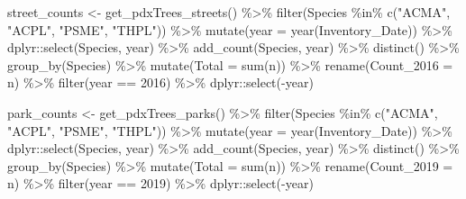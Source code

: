 \documentclass[12pt,twoside]{reedthesis}
\newenvironment{Shaded}{\begin{snugshade}}{\end{snugshade}}
\newcommand{\AttributeTok}[1]{\textcolor[rgb]{0.77,0.63,0.00}{#1}}
\newcommand{\DecValTok}[1]{\textcolor[rgb]{0.00,0.00,0.81}{#1}}
\newcommand{\FunctionTok}[1]{\textcolor[rgb]{0.00,0.00,0.00}{#1}}
\newcommand{\NormalTok}[1]{#1}
\newcommand{\OtherTok}[1]{\textcolor[rgb]{0.56,0.35,0.01}{#1}}
\newcommand{\SpecialCharTok}[1]{\textcolor[rgb]{0.00,0.00,0.00}{#1}}
\newcommand{\StringTok}[1]{\textcolor[rgb]{0.31,0.60,0.02}{#1}}
\begin{document}
\footnotesize
\begin{Shaded}
\begin{Highlighting}[]
\NormalTok{street\_counts }\OtherTok{\textless{}{-}} \FunctionTok{get\_pdxTrees\_streets}\NormalTok{() }\SpecialCharTok{\%\textgreater{}\%}
    \FunctionTok{filter}\NormalTok{(Species }\SpecialCharTok{\%in\%} \FunctionTok{c}\NormalTok{(}\StringTok{"ACMA"}\NormalTok{, }\StringTok{"ACPL"}\NormalTok{, }\StringTok{"PSME"}\NormalTok{, }\StringTok{"THPL"}\NormalTok{)) }\SpecialCharTok{\%\textgreater{}\%}
    \FunctionTok{mutate}\NormalTok{(}\AttributeTok{year =} \FunctionTok{year}\NormalTok{(Inventory\_Date)) }\SpecialCharTok{\%\textgreater{}\%}
\NormalTok{    dplyr}\SpecialCharTok{::}\FunctionTok{select}\NormalTok{(Species, year) }\SpecialCharTok{\%\textgreater{}\%}
    \FunctionTok{add\_count}\NormalTok{(Species, year) }\SpecialCharTok{\%\textgreater{}\%}
    \FunctionTok{distinct}\NormalTok{() }\SpecialCharTok{\%\textgreater{}\%}
    \FunctionTok{group\_by}\NormalTok{(Species) }\SpecialCharTok{\%\textgreater{}\%}
    \FunctionTok{mutate}\NormalTok{(}\AttributeTok{Total =} \FunctionTok{sum}\NormalTok{(n)) }\SpecialCharTok{\%\textgreater{}\%}
    \FunctionTok{rename}\NormalTok{(}\AttributeTok{Count\_2016 =}\NormalTok{ n) }\SpecialCharTok{\%\textgreater{}\%}
    \FunctionTok{filter}\NormalTok{(year }\SpecialCharTok{==} \DecValTok{2016}\NormalTok{) }\SpecialCharTok{\%\textgreater{}\%}
\NormalTok{    dplyr}\SpecialCharTok{::}\FunctionTok{select}\NormalTok{(}\SpecialCharTok{{-}}\NormalTok{year)}

\NormalTok{park\_counts }\OtherTok{\textless{}{-}} \FunctionTok{get\_pdxTrees\_parks}\NormalTok{() }\SpecialCharTok{\%\textgreater{}\%}
    \FunctionTok{filter}\NormalTok{(Species }\SpecialCharTok{\%in\%} \FunctionTok{c}\NormalTok{(}\StringTok{"ACMA"}\NormalTok{, }\StringTok{"ACPL"}\NormalTok{, }\StringTok{"PSME"}\NormalTok{, }\StringTok{"THPL"}\NormalTok{)) }\SpecialCharTok{\%\textgreater{}\%}
    \FunctionTok{mutate}\NormalTok{(}\AttributeTok{year =} \FunctionTok{year}\NormalTok{(Inventory\_Date)) }\SpecialCharTok{\%\textgreater{}\%}
\NormalTok{    dplyr}\SpecialCharTok{::}\FunctionTok{select}\NormalTok{(Species, year) }\SpecialCharTok{\%\textgreater{}\%}
    \FunctionTok{add\_count}\NormalTok{(Species, year) }\SpecialCharTok{\%\textgreater{}\%}
    \FunctionTok{distinct}\NormalTok{() }\SpecialCharTok{\%\textgreater{}\%}
    \FunctionTok{group\_by}\NormalTok{(Species) }\SpecialCharTok{\%\textgreater{}\%}
    \FunctionTok{mutate}\NormalTok{(}\AttributeTok{Total =} \FunctionTok{sum}\NormalTok{(n)) }\SpecialCharTok{\%\textgreater{}\%}
    \FunctionTok{rename}\NormalTok{(}\AttributeTok{Count\_2019 =}\NormalTok{ n) }\SpecialCharTok{\%\textgreater{}\%}
    \FunctionTok{filter}\NormalTok{(year }\SpecialCharTok{==} \DecValTok{2019}\NormalTok{) }\SpecialCharTok{\%\textgreater{}\%}
\NormalTok{    dplyr}\SpecialCharTok{::}\FunctionTok{select}\NormalTok{(}\SpecialCharTok{{-}}\NormalTok{year)}
\end{Highlighting}
\end{Shaded}
\end{document}
